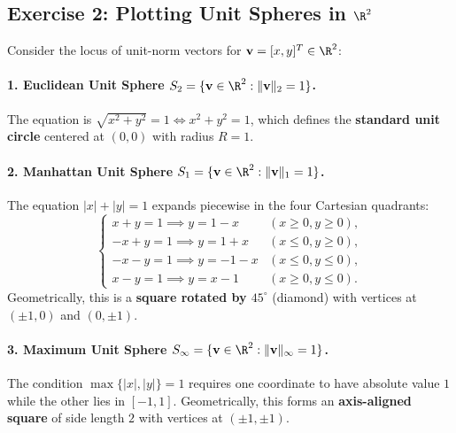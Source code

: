 \subsection{Exercise 2: Plotting Unit Spheres in \texorpdfstring{$\R^2$}{R2}}
Consider the locus of unit-norm vectors for $\mathbf{v} = [x, y]^T \in \R^2$:

\paragraph{1. Euclidean Unit Sphere $S_2 = \{ \mathbf{v} \in \R^2 : \|\mathbf{v}\|_2 = 1 \}$.}
The equation is $\sqrt{x^2 + y^2} = 1 \iff x^2 + y^2 = 1$, which defines the \textbf{standard unit circle} centered at $(0,0)$ with radius $R = 1$.

\paragraph{2. Manhattan Unit Sphere $S_1 = \{ \mathbf{v} \in \R^2 : \|\mathbf{v}\|_1 = 1 \}$.}
The equation $|x| + |y| = 1$ expands piecewise in the four Cartesian quadrants:
\begin{equation}
    \begin{cases}
        x + y = 1 \implies y = 1 - x & (x \ge 0, y \ge 0), \\
        -x + y = 1 \implies y = 1 + x & (x \le 0, y \ge 0), \\
        -x - y = 1 \implies y = -1 - x & (x \le 0, y \le 0), \\
        x - y = 1 \implies y = x - 1 & (x \ge 0, y \le 0).
    \end{cases}
\end{equation}
Geometrically, this is a \textbf{square rotated by $45^\circ$} (diamond) with vertices at $(\pm 1, 0)$ and $(0, \pm 1)$.

\paragraph{3. Maximum Unit Sphere $S_\infty = \{ \mathbf{v} \in \R^2 : \|\mathbf{v}\|_\infty = 1 \}$.}
The condition $\max\{|x|, |y|\} = 1$ requires one coordinate to have absolute value $1$ while the other lies in $[-1, 1]$. Geometrically, this forms an \textbf{axis-aligned square} of side length $2$ with vertices at $(\pm 1, \pm 1)$.

